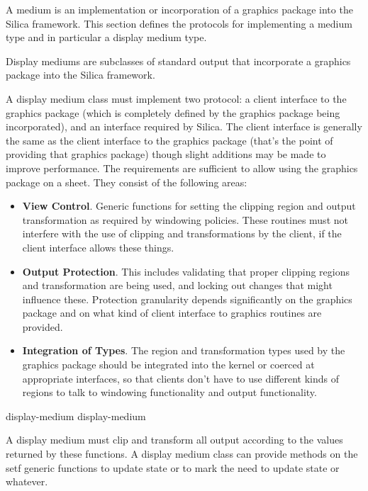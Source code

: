 {A medium is an implementation or incorporation of a graphics package into the
Silica framework.  This section defines the protocols for implementing a medium
type and in particular a display medium type.


Display mediums are subclasses of standard output that incorporate a graphics
package into the Silica framework.
  
A display medium class must implement two protocol: a client interface to the
graphics package (which is completely defined by the graphics package being
incorporated), and an interface required by Silica.  The client interface is
generally the same as the client interface to the graphics package (that's the
point of providing that graphics package) though slight additions may be made to
improve performance.  The  requirements are
sufficient to allow using the graphics package on a sheet.  They consist of the
following areas:

\begin{itemize}
\item {\bf View Control}.  Generic functions for setting the clipping region and
output transformation as required by windowing policies.  These routines must
not interfere with the use of clipping and transformations by the client, if the
client interface allows these things.

\item {\bf Output Protection}.  This includes validating that proper clipping
regions and transformation are being used, and locking out changes that might
influence these.  Protection granularity depends significantly on the graphics
package and on what kind of client interface to graphics routines are provided.

\item {\bf Integration of Types}. The region and transformation types used by
the graphics package should be integrated into the kernel or coerced at
appropriate interfaces, so that clients don't have to use different kinds of
regions to talk to windowing functionality and output functionality.
\end{itemize}

 {display-medium}
 {display-medium}

A display medium must clip and transform all output according to the values
returned by these functions.  A display medium class can provide methods on the
setf generic functions to update state or to mark the need to update state or
whatever.

}

